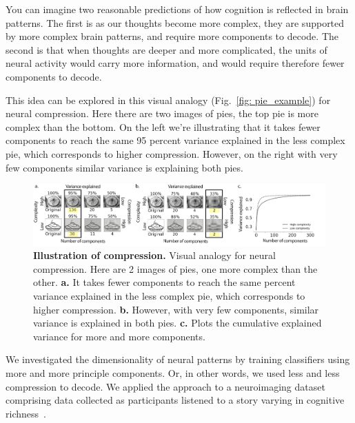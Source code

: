 \documentclass[english]{article}
\begin{document}
You can imagine two reasonable predictions of how cognition is reflected in
brain patterns. The first is as our thoughts become more complex, they are
supported by more complex brain patterns, and require more components to
decode. The second is that when thoughts are deeper and more complicated, the
units of neural activity would carry more information, and would require
therefore fewer components to decode.


This idea can be explored in this visual analogy (Fig.~\ref{fig: pie_example})
for neural compression. Here there are two images of pies, the top pie is more
complex than the bottom. On the left we're illustrating that it takes fewer
components to reach the same 95 percent variance explained in the less complex
pie, which corresponds to higher compression. However, on the right with very
few components similar variance is explaining both pies.

\begin{figure}
  \centering
  \includegraphics[width=\textwidth]{figs/pie_example.pdf}
  \caption{\textbf{Illustration of compression.} Visual analogy for
    neural compression. Here are 2 images of pies, one more complex
    than the other. \textbf{a.} It takes fewer components to reach the same percent
    variance explained in the less complex pie, which corresponds to
    higher compression. \textbf{b.} However, with very few components, similar variance is explained in both pies.
\textbf{c.} Plots the cumulative explained variance for more and more components.}
  \label{fig:pie_example}
\end{figure}


We investigated the dimensionality of neural patterns by training
classifiers using more and more principle components. Or, in other
words, we used less and less compression to decode.
We applied the approach to
a neuroimaging dataset comprising data collected as participants
listened to a story varying in cognitive richness~\citep{SimoEtal16}.



\end{document}
